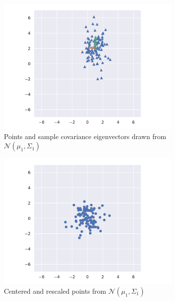 \documentclass[11pt,letterpaper]{article}
\numberwithin{equation}{section}
\numberwithin{figure}{section}
\begin{document}
\begin{figure}[p]
\centering
\begin{subfigure}[t]{0.49\textwidth}
	\centering
	\includegraphics[width=\textwidth]{figures/unscale_plot_1.pdf}
	\caption{Points and sample covariance eigenvectors drawn from $\mathcal{N}(\mu_1,\Sigma_1)$}
\end{subfigure}
%
\begin{subfigure}[t]{0.49\textwidth}
	\centering
	\includegraphics[width=\textwidth]{figures/scale_plot_1.pdf}
	\caption{Centered and rescaled points from $\mathcal{N}(\mu_1,\Sigma_1)$}
\end{subfigure}
\\
\begin{subfigure}[t]{0.49\textwidth}

\end{subfigure}
\end{figure}
\end{document}
